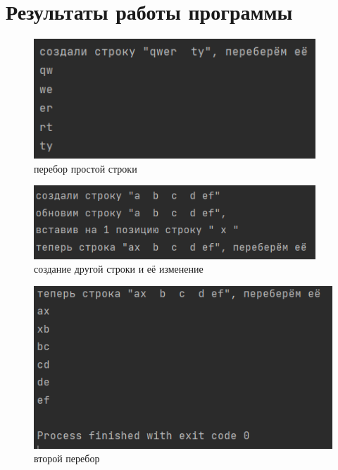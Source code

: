 ﻿\documentclass[a4paper, 12pt]{extarticle}
\begin{document}
\section{Результаты работы программы}
\begin{figure}[H]
    \centering
    \includegraphics[width=300pt]{Test.png}
    \caption{перебор простой строки}
    \label{fig:my_label}
\end{figure}

\begin{figure}[H]
    \centering
    \includegraphics[width=300pt]{Test1.png}
    \caption{создание другой строки и её изменение}
    \label{fig:my_label}
\end{figure}

\begin{figure}[H]
    \centering
    \includegraphics[width=400pt]{Test2.png}
    \caption{второй перебор}
    \label{fig:my_label}
\end{figure}
\end{document}
